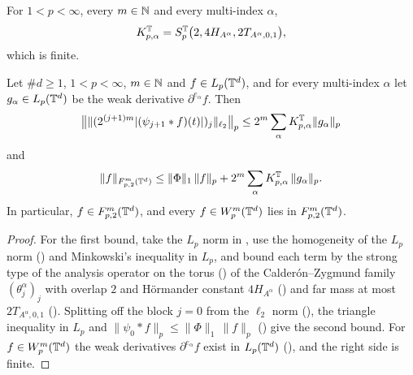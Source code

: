 \begin{definition}
\label{def:torus-sobolev-to-tl-const}
\leanok
{}
For $1 < p < \infty$, every $m \in \mathbb{N}$ and every multi-index $\alpha$,
\[
  K^{\mathbb{T}}_{p,\alpha} = S^{\mathbb{T}}_{p}\bigl(2, 4 H_{A^\alpha}, 2 T_{A^\alpha,0,1}\bigr) ,
\]
which is finite.
\end{definition}

\begin{theorem}
\label{thm:torus-sobolev-to-triebel-lizorkin}
\leanok
{}
Let $\#d \geq 1$, $1 < p < \infty$, $m \in \mathbb{N}$ and
$f \in L_p(\mathbb{T}^d)$, and for every multi-index $\alpha$ let $g_\alpha \in L_p(\mathbb{T}^d)$ be the weak
derivative $\partial^{e_\alpha} f$. Then
\[
  \bigl\| \|(2^{(j+1)m} |(\psi_{j+1} * f)(t)|)_j\|_{\ell_2} \bigr\|_p
  \leq 2^m \sum_\alpha K^{\mathbb{T}}_{p,\alpha} \|g_\alpha\|_p
\]
and
\[
  \|f\|_{F^{m}_{p,2}(\mathbb{T}^d)} \leq \|\Phi\|_1 \, \|f\|_p + 2^m \sum_\alpha K^{\mathbb{T}}_{p,\alpha} \,
  \|g_\alpha\|_p .
\]
In particular, $f \in F^{m}_{p,2}(\mathbb{T}^d)$, and every $f \in W^{m}_{p}(\mathbb{T}^d)$ lies in
$F^{m}_{p,2}(\mathbb{T}^d)$.
\end{theorem}

\begin{proof}
\leanok
For the first bound, take the $L_p$ norm in
, use the homogeneity of the $L_p$ norm
() and Minkowski's inequality in $L_p$, and bound each term by the
strong type of the analysis operator on the torus () of
the Calder\'on--Zygmund family $(\theta^\alpha_j)_j$ with overlap $2$ and H\"ormander constant
$4 H_{A^\alpha}$ () and far mass at most $2 T_{A^\alpha,0,1}$
(). Splitting off the block $j = 0$ from the $\ell_2$
norm (), the triangle inequality in $L_p$ and
$\|\psi_0 * f\|_p \leq \|\Phi\|_1 \, \|f\|_p$ () give the second
bound. For $f \in W^{m}_{p}(\mathbb{T}^d)$ the weak derivatives $\partial^{e_\alpha} f$ exist in
$L_p(\mathbb{T}^d)$ (), and the right side is finite.
\end{proof}

